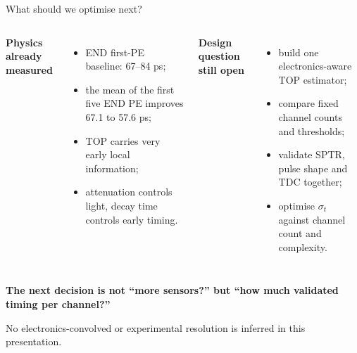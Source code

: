 \documentclass[aspectratio=169,9pt]{beamer}
\newcommand{\Source}[1]{\par\vfill{\scriptsize\color{gray}#1\par}}
\newcommand{\Result}[1]{{\Large\bfseries\color{endblue}#1}}
\begin{document}
\begin{frame}{What should we optimise next?}
\begin{columns}[T]
\textbf{Physics already measured}
\begin{itemize}
\item END first-PE baseline: 67--84 ps;
\item the mean of the first five END PE improves 67.1 to 57.6 ps;
\item TOP carries very early local information;
\item attenuation controls light, decay time controls early timing.
\end{itemize}
\textbf{Design question still open}
\begin{itemize}
\item build one electronics-aware TOP estimator;
\item compare fixed channel counts and thresholds;
\item validate SPTR, pulse shape and TDC together;
\item optimise $\sigma_t$ against channel count and complexity.
\end{itemize}
\end{columns}
\vspace{9pt}
\centering
\Result{The next decision is not ``more sensors?'' but ``how much validated timing per channel?''}
\Source{No electronics-convolved or experimental resolution is inferred in this presentation.}
\end{frame}

\appendix

\end{document}
